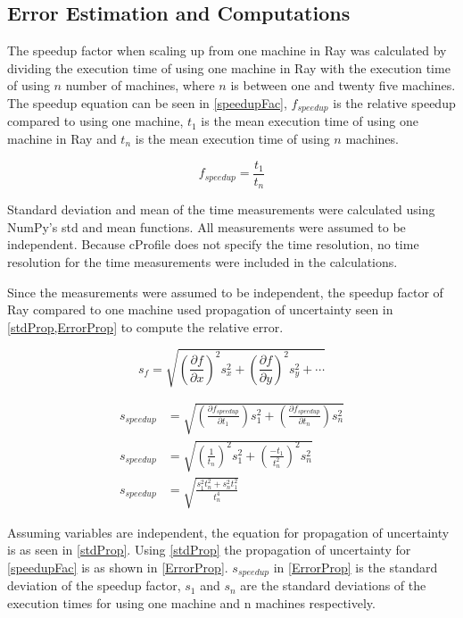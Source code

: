 \documentclass[12pt, a4paper]{article}
\begin{document}
\subsection{Error Estimation and Computations}

The speedup factor when scaling up from one machine in Ray was calculated by dividing the execution time of using one machine in Ray with the execution time of using $n$ number of machines, where $n$ is between one and twenty five machines.
The speedup equation can be seen in \cref{speedupFac}, $f_{speedup}$ is the relative speedup compared to using one machine, $t_1$ is the mean execution time of using one machine in Ray and $t_n$ is the mean execution time of using $n$ machines.

\begin{equation}\label{speedupFac}
    f_{speedup} = \frac{t_1}{t_n}
\end{equation}

Standard deviation and mean of the time measurements were calculated using NumPy's std and mean functions.
All measurements were assumed to be independent.
Because cProfile does not specify the time resolution, no time resolution for the time measurements were included in the calculations.

Since the measurements were assumed to be independent, the speedup factor of Ray compared to one machine used propagation of uncertainty seen in \cref{stdProp,ErrorProp} to compute the relative error.

\begin{equation}\label{stdProp}
    s_f = \sqrt{\left(\frac{\partial f}{\partial x}\right)^2s_x^2 + \left(\frac{\partial f}{\partial y}\right)^2s_y^2 + \cdots}
\end{equation}

\begin{equation}\label{ErrorProp}
    \begin{aligned}
        s_{speedup} &=  \sqrt{\left(\frac{\partial f_{speedup}}{\partial t_1}\right)s_1^2 + \left(\frac{\partial f_{speedup}}{\partial t_n}\right)s_n^2} \\
        s_{speedup} &= \sqrt{\left(\frac{1}{t_n}\right)^2s_1^2 + \left(\frac{-t_1}{t_n^2}\right)^2s_n^2}\\
        s_{speedup} &= \sqrt{\frac{s_{1}^2t_n^2 + s_{n}^2t_1^2}{t_n^4}}
    \end{aligned}
\end{equation}

Assuming variables are independent, the equation for propagation of uncertainty is as seen in \cref{stdProp}.
Using \cref{stdProp} the propagation of uncertainty for \cref{speedupFac} is as shown in \cref{ErrorProp}.
$s_{speedup}$ in \cref{ErrorProp} is the standard deviation of the speedup factor, $s_1$ and $s_n$ are the standard deviations of the execution times for using one machine and n machines respectively.
\end{document}
